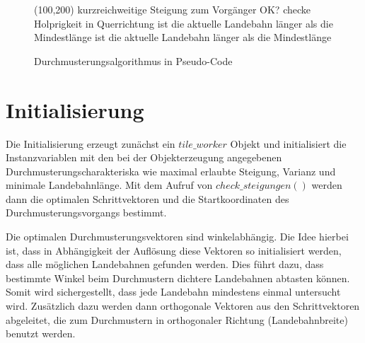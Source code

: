 \documentclass[10pt,a4paper]{report}
\begin{document}
\clearpage
\begin{figure}
\begin{struktogramm}(100,200)
{kurzreichweitige Steigung zum Vorgänger OK?}{\sTrue}{\sFalse}
{checke Holprigkeit in Querrichtung}{\sTrue}{\sFalse}
\change
{}
{ist die aktuelle Landebahn länger als die Mindestlänge}{\sTrue}{\sFalse}
\change
{}
\ifend
\ifend
\change
{}
{ist die aktuelle Landebahn länger als die Mindestlänge}{\sTrue}{\sFalse}
\change
{}
\ifend
{}
\ifend
\forallinend
\end{struktogramm}
\caption{Durchmusterungsalgorithmus in Pseudo-Code}\label{nasshnlogisch}
\end{figure}
\clearpage
\section{Initialisierung}

Die Initialisierung erzeugt zunächst ein $tile\_worker$ Objekt und initialisiert die Instanzvariablen mit den bei der Objekterzeugung angegebenen Durchmusterungscharakteriska wie maximal erlaubte Steigung, Varianz und minimale Landebahnlänge.
Mit dem Aufruf von $check\_steigungen()$ werden dann die optimalen Schrittvektoren und die Startkoordinaten des Durchmusterungsvorgangs bestimmt.

Die optimalen Durchmusterungsvektoren sind winkelabhängig. Die Idee hierbei ist, dass in Abhängigkeit der Auflösung diese Vektoren so initialisiert werden, dass alle möglichen Landebahnen gefunden werden. Dies führt dazu, dass bestimmte Winkel beim Durchmustern dichtere Landebahnen abtasten können. Somit wird sichergestellt, dass jede Landebahn mindestens einmal untersucht wird.
Zusätzlich dazu werden dann orthogonale Vektoren aus den Schrittvektoren abgeleitet, die zum Durchmustern in orthogonaler Richtung (Landebahnbreite) benutzt werden.
\end{document}
